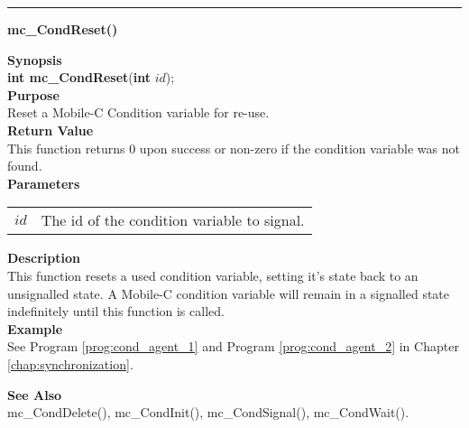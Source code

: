 \noindent
\vspace{5pt}
\rule{6.5in}{0.015in}
\noindent
{}
{\LARGE \bf mc\_CondReset()}\\

\noindent
{\bf Synopsis}\\
{\bf int mc\_CondReset}({\bf int} $id$);\\

\noindent
{\bf Purpose}\\
Reset a Mobile-C Condition variable for re-use.\\

\noindent
{\bf Return Value}\\
This function returns 0 upon success or non-zero if the condition 
variable was not found. \\

\noindent
{\bf Parameters}
\vspace{-0.1pt}
\begin{description}
\item
\begin{tabular}{p{10 mm}p{145 mm}}
$id$ & The id of the condition variable to signal.
\end{tabular} 
\end{description}

\noindent
{\bf Description}\\
This function resets a used condition variable, setting it's state
back to an unsignalled state. A Mobile-C condition variable will
remain in a signalled state indefinitely until this function is called.\\

\noindent
{\bf Example}\\
See Program \vref{prog:cond_agent_1} and Program
\vref{prog:cond_agent_2} in Chapter \ref{chap:synchronization}.\\
\noindent

\noindent
{\bf See Also}\\
mc\_CondDelete(), mc\_CondInit(), mc\_CondSignal(), mc\_CondWait().\\

